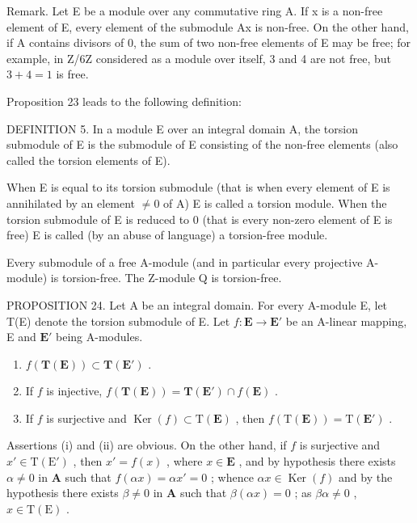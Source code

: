 Remark. Let E be a module over any commutative ring A. If x is a non-free element of E, every element of the submodule Ax is non-free. On the other hand, if A contains divisors of 0, the sum of two non-free elements of E may be free; for example, in Z/6Z considered as a module over itself, 3 and 4 are not free, but \(3 + 4 = 1\) is free.

Proposition 23 leads to the following definition:

DEFINITION 5. In a module E over an integral domain A, the torsion submodule of E is the submodule of E consisting of the non-free elements (also called the torsion elements of E).

When E is equal to its torsion submodule (that is when every element of E is annihilated by an element \(\neq0\) of A) E is called a torsion module. When the torsion submodule of E is reduced to 0 (that is every non-zero element of E is free) E is called (by an abuse of language) a torsion-free module.

Every submodule of a free A-module (and in particular every projective A-module) is torsion-free. The Z-module Q is torsion-free.

PROPOSITION 24. Let A be an integral domain. For every A-module E, let T(E) denote the torsion submodule of E. Let \(f: \mathbf{E} \to \mathbf{E}'\) be an A-linear mapping, E and \(\mathbf{E}'\) being A-modules.

\begin{enumerate}
\def\labelenumi{(\roman{enumi})}
\item
  \(f(\mathbf{T}(\mathbf{E})) \subset \mathbf{T}(\mathbf{E}')\) .
\item
  If \(f\) is injective, \(f(\mathbf{T}(\mathbf{E})) = \mathbf{T}(\mathbf{E}') \cap f(\mathbf{E})\) .
\item
  If \(f\) is surjective and \(\operatorname{Ker}(f) \subset \mathrm{T}(\mathbf{E})\) , then \(f(\mathrm{T}(\mathbf{E})) = \mathrm{T}(\mathbf{E}')\) .
\end{enumerate}

Assertions (i) and (ii) are obvious. On the other hand, if \(f\) is surjective and \(x' \in \mathrm{T}(\mathrm{E}')\) , then \(x' = f(x)\) , where \(x \in \mathbf{E}\) , and by hypothesis there exists \(\alpha \neq 0\) in \(\mathbf{A}\) such that \(f(\alpha x) = \alpha x' = 0\) ; whence \(\alpha x \in \operatorname{Ker}(f)\) and by the hypothesis there exists \(\beta \neq 0\) in \(\mathbf{A}\) such that \(\beta(\alpha x) = 0\) ; as \(\beta \alpha \neq 0\) , \(x \in \mathrm{T}(\mathrm{E})\) .

